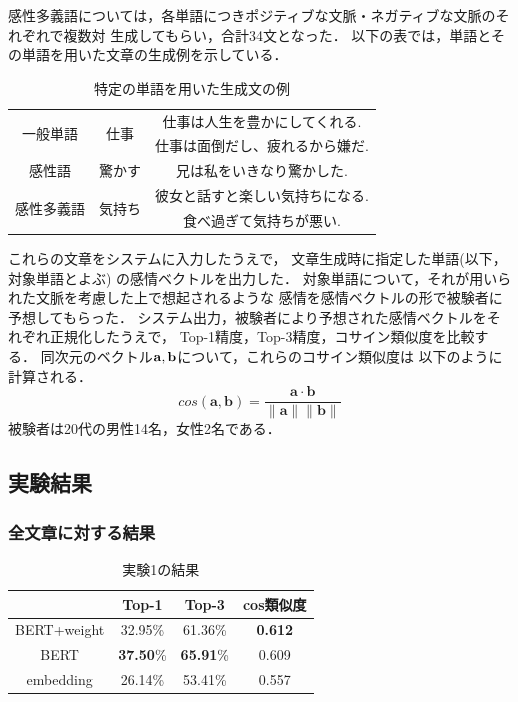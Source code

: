 		感性多義語については，各単語につきポジティブな文脈・ネガティブな文脈のそれぞれで複数対
		生成してもらい，合計34文となった．
		以下の表では，単語とその単語を用いた文章の生成例を示している．
		\begin{table}[H]
			\centering
			\caption{特定の単語を用いた生成文の例}
			\label{table:generated_sentences_sample}
			\begin{tabular}{|c|c|c|}
				\hline
				\multirow{2}{*}{一般単語} & \multirow{2}{*}{仕事} & 仕事は人生を豊かにしてくれる. \\
				\cline{3-3}
				& & 仕事は面倒だし、疲れるから嫌だ. \\
				\hline
				感性語 & 驚かす & 兄は私をいきなり驚かした. \\
				\hline
				\multirow{2}{*}{感性多義語} & \multirow{2}{*}{気持ち} & 彼女と話すと楽しい気持ちになる. \\
				\cline{3-3}
				& & 食べ過ぎて気持ちが悪い. \\
				\hline
			\end{tabular}
		\end{table}

		これらの文章をシステムに入力したうえで，
		文章生成時に指定した単語(以下，対象単語とよぶ)
		の感情ベクトルを出力した．
		対象単語について，それが用いられた文脈を考慮した上で想起されるような
		感情を感情ベクトルの形で被験者に予想してもらった．
		システム出力，被験者により予想された感情ベクトルをそれぞれ正規化したうえで，
		Top-1精度，Top-3精度，コサイン類似度を比較する．
		同次元のベクトル$\bold{a},\bold{b}$について，これらのコサイン類似度は
		以下のように計算される．
		\begin{equation}
			cos(\boldsymbol{a},\boldsymbol{b})=\frac{\boldsymbol{a}\cdot\boldsymbol{b}}{\|\boldsymbol{a}\|\|\boldsymbol{b}\|}
		\end{equation}
		被験者は20代の男性14名，女性2名である．

	\subsection{実験結果}
		\subsubsection{全文章に対する結果}
			\begin{table}[H]
				\centering
				\caption{実験1の結果}
				\label{table:top-k_cos-sim_all}
					\begin{tabular}{cccc}
						\hline
						& Top-1 & Top-3 & cos類似度 \\
						\hline \hline
						BERT+weight & 32.95\% & 61.36\% & \textbf{0.612} \\
						BERT & \textbf{37.50}\% & \textbf{65.91}\% & 0.609 \\
						embedding & 26.14\% & 53.41\% & 0.557\\
						\hline
					\end{tabular}
			\end{table}


